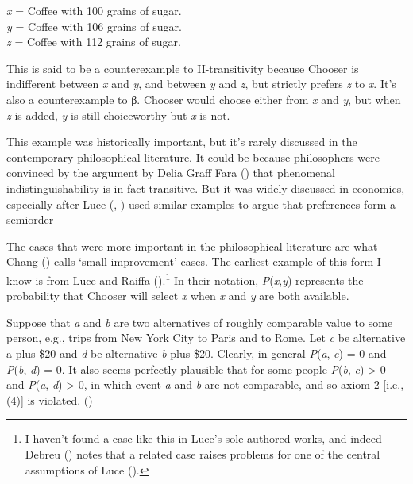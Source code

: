 \documentclass[
  10.5pt,
  twoside]{article}
\renewenvironment{quote}
  {\vskip 5pt%
   \list{}{
    \setlength{\listparindent}{.25in}
    \setlength{\leftmargin}{.25in}
    \setlength{\rightmargin}{\leftmargin}
    \setlength{\parsep}{0in plus 0in minus 0in}
    }
    \item\relax
    \let\item\relax}
  {\endlist\vskip 5pt}
\begin{document}
\begin{quote}
\emph{x} = Coffee with 100 grains of sugar.\\
\emph{y} = Coffee with 106 grains of sugar.\\
\emph{z} = Coffee with 112 grains of sugar.
\end{quote}

This is said to be a counterexample to II-transitivity because Chooser
is indifferent between \emph{x} and \emph{y}, and between \emph{y} and
\emph{z}, but strictly prefers \emph{z} to \emph{x}. It's also a
counterexample to β. Chooser would choose either from \emph{x} and
\emph{y}, but when \emph{z} is added, \emph{y} is still choiceworthy but
\emph{x} is not.

This example was historically important, but it's rarely discussed in
the contemporary philosophical literature. It could be because
philosophers were convinced by the argument by Delia Graff Fara
() that phenomenal indistinguishability is
in fact transitive. But it was widely discussed in economics, especially
after Luce (,
) used similar examples to argue that
preferences form a semiorder

The cases that were more important in the philosophical literature are
what Chang () calls `small improvement'
cases. The earliest example of this form I know is from Luce and Raiffa
().\footnote{I haven't found a case
  like this in Luce's sole-authored works, and indeed Debreu
  () notes that a related case raises
  problems for one of the central assumptions of Luce
  ().} In their notation,
\emph{P}(\emph{x},\emph{y}) represents the probability that Chooser will
select \emph{x} when \emph{x} and \emph{y} are both available.

\begin{quote}
Suppose that \emph{a} and \emph{b} are two alternatives of roughly
comparable value to some person, e.g., trips from New York City to Paris
and to Rome. Let \emph{c} be alternative a plus \$20 and \emph{d} be
alternative \emph{b} plus \$20. Clearly, in general \emph{P}(\emph{a},
\emph{c}) = 0 and \emph{P}(\emph{b}, \emph{d}) = 0. It also seems
perfectly plausible that for some people \emph{P}(\emph{b}, \emph{c})
\textgreater{} 0 and \emph{P}(\emph{a}, \emph{d}) \textgreater{} 0, in
which event \emph{a} and \emph{b} are not comparable, and so axiom 2
{[}i.e., (4){]} is violated. ()
\end{quote}
\end{document}
